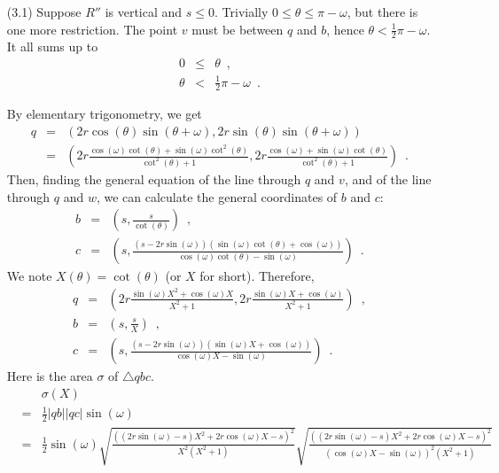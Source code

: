 \documentclass[11pt, oneside]{article}
\begin{document}
\begin{enumerate}
\begin{enumerate}
\item[(3.1)] Suppose $R''$ is vertical and $s\leq 0$.
Trivially $0 \leq \theta \leq \pi-\omega$,
but there is one more restriction.
The point $v$ must be between $q$ and $b$,
hence $\theta < \frac{1}{2}\pi-\omega$.
It all sums up to
\begin{eqnarray}
\label{lemma arc fixed line minimal triangle constraint 7}
0 &\leq& \theta \enspace,\\
\label{lemma arc fixed line minimal triangle constraint 8}
\theta &<& \frac{1}{2}\pi-\omega \enspace.
\end{eqnarray}

By elementary trigonometry,
we get
\begin{eqnarray*}
q &=& (2r\cos(\theta)\sin(\theta+\omega),2r\sin(\theta)\sin(\theta+\omega))\\
  &=& \left(2r\frac{\cos(\omega)\cot(\theta)+\sin(\omega)\cot^2\!(\theta)}{\cot^2\!(\theta)+1},2r\frac{\cos(\omega)+\sin(\omega)\cot(\theta)}{\cot^2\!(\theta)+1}\right)\enspace.
\end{eqnarray*}
Then,
finding the general equation of the line through $q$ and $v$,
and of the line through $q$ and $w$,
we can calculate the general coordinates of $b$ and $c$:
\begin{eqnarray*}
b &=& \left(s,\frac{s}{\cot(\theta)}\right) \enspace,\\
c &=& \left(s,\frac{(s-2r\sin(\omega))(\sin(\omega)\cot(\theta)+\cos(\omega))}{\cos(\omega)\cot(\theta)-\sin(\omega)}\right) \enspace.
\end{eqnarray*}
We note $X(\theta)=\cot(\theta)$
(or $X$ for short).
Therefore,
\begin{eqnarray*}
q &=& \left(2r\frac{\sin(\omega)X^2+\cos(\omega)X}{X^2+1},2r\frac{\sin(\omega)X+\cos(\omega)}{X^2+1}\right)\enspace,\\
b &=& \left(s,\frac{s}{X}\right) \enspace,\\
c &=& \left(s,\frac{(s-2r\sin(\omega))(\sin(\omega)X+\cos(\omega))}{\cos(\omega)X-\sin(\omega)}\right) \enspace.
\end{eqnarray*}
Here is the area $\sigma$ of $\triangle qbc$.
\begin{eqnarray*}
&& \sigma(X)\\
&=& \frac{1}{2}|qb||qc|\sin(\omega)\\
&=& \frac{1}{2}\sin(\omega)
\sqrt{\frac{((2r\sin(\omega)-s)X^2+2r\cos(\omega)X-s)^2}{X^2(X^2+1)}}
\sqrt{\frac{((2r\sin(\omega)-s)X^2+2r\cos(\omega)X-s)^2}{(\cos(\omega)X-\sin(\omega))^2(X^2+1)}}\\

\end{eqnarray*}
\end{enumerate}
\end{enumerate}
\end{document}

